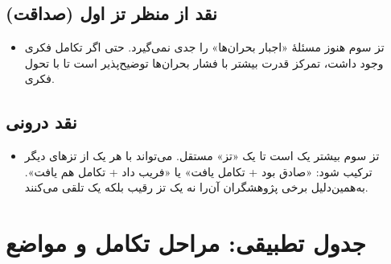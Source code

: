 \subsection{نقد از منظر تز اول (صداقت)}

\begin{itemize}[label=\textcolor{cGreen}{$\times$}, rightmargin=2em]
    \item تز سوم هنوز مسئلهٔ «اجبار بحران‌ها» را جدی نمی‌گیرد. حتی اگر تکامل فکری وجود داشت،  تمرکز قدرت بیشتر با فشار بحران‌ها توضیح‌پذیر است تا با تحول فکری.
\end{itemize}

\subsection{نقد درونی}

\begin{itemize}[label=\textcolor{cGold}{$\times$}, rightmargin=2em]
    \item تز سوم بیشتر یک  است تا یک «تز» مستقل. می‌تواند با هر یک از تزهای دیگر ترکیب شود: «صادق بود + تکامل یافت» یا «فریب داد + تکامل هم یافت». به‌همین‌دلیل برخی پژوهشگران آن‌را نه یک تز رقیب بلکه یک  تلقی می‌کنند.
\end{itemize}

\section{جدول تطبیقی: مراحل تکامل و مواضع}

